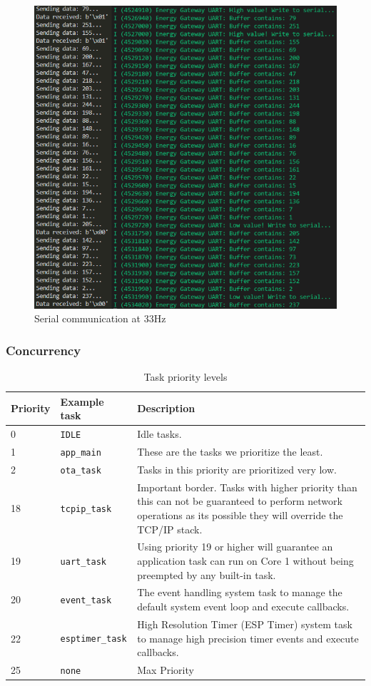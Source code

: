 \begin{figure}[ht]
  \centering
  \includegraphics[width=0.8\linewidth]{figures/send_receive_33Hz.png}
  \caption{Serial communication at 33Hz}
  \label{fig:serial_communication_33hz}
\end{figure}

\subsubsection{Concurrency}

\begin{table}[ht]
  \centering
  \caption{Task priority levels}
  \label{table:task-priorities}
  \begin{tabularx}{\textwidth}{p{1cm}Xp{10cm}}
    \hline
    \textbf{Priority} & \textbf{Example task} & \textbf{Description} \\ 
    \hline
    0 & \texttt{IDLE} & Idle tasks. \\
    \hline
    1 & \texttt{app\_main} & These are the tasks we prioritize the least.\\
    \hline
    2 & \texttt{ota\_task} & Tasks in this priority are prioritized very low.\\
    \hline
    18 & \texttt{tcpip\_task} & Important border. Tasks with higher priority than this can not be guaranteed to perform network operations as its possible they will override the TCP/IP stack. \\
    \hline
    19 & \texttt{uart\_task} & Using priority 19 or higher will guarantee an application task can run on Core 1 without being preempted by any built-in task\cite{espressif:esp-idf-programming-guide}. \\
    \hline
    20 & \texttt{event\_task} & The event handling system task to manage the default system event loop and execute callbacks. \\
    \hline
    22 & \texttt{esptimer\_task} & High Resolution Timer (ESP Timer) system task to manage high precision timer events and execute callbacks. \\
    \hline
    25 & \texttt{none} & Max Priority \\
    \hline
  \end{tabularx}
\end{table}

